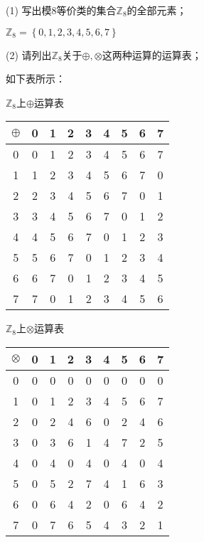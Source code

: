 (1) 写出模$8$等价类的集合$\mathbb{Z}_8$的全部元素；

\begin{Solution}
    $\mathbb{Z}_8 = \left\{0,1,2,3,4,5,6,7\right\}$
\end{Solution}

(2) 请列出$\mathbb{Z}_8$关于$\oplus,\otimes$这两种运算的运算表；

\begin{Solution}
    如下表所示：

\begin{minipage}[t]{0.45\linewidth}
        \centering
        \makeatletter{}\makeatother\caption{$\mathbb{Z}_8$上$\oplus$运算表}
        \begin{tabular}{|c|c|c|c|c|c|c|c|c|}
        \hline
        $\oplus$  & 0 &  1  & 2  & 3  & 4  & 5  & 6  & 7\\ \hline
        0  & 0 &  1  & 2  & 3  & 4  & 5  & 6  & 7\\ \hline
        1  & 1 &  2  & 3  & 4  & 5  & 6  & 7  & 0\\ \hline
        2  & 2 &  3  & 4  & 5  & 6  & 7  & 0  & 1\\ \hline
        3  & 3 &  4  & 5  & 6  & 7  & 0  & 1  & 2\\ \hline
        4  & 4 &  5  & 6  & 7  & 0  & 1  & 2  & 3\\ \hline
        5  & 5 &  6  & 7  & 0  & 1  & 2  & 3  & 4\\ \hline
        6  & 6 &  7  & 0  & 1  & 2  & 3  & 4  & 5\\ \hline
        7  & 7 &  0  & 1  & 2  & 3  & 4  & 5  & 6\\ \hline
        \end{tabular}
\end{minipage}%
\begin{minipage}[t]{0.45\linewidth}
        \centering
        \makeatletter{}\makeatother\caption{$\mathbb{Z}_8$上$\otimes$运算表}
        \begin{tabular}{|c|c|c|c|c|c|c|c|c|}
        \hline
        $\otimes$  & 0  & 1  & 2 &  3 &  4 &  5 &  6 &  7\\ \hline
        0  & 0  & 0  & 0 &  0 &  0 &  0 &  0 &  0\\ \hline
        1  & 0  & 1  & 2 &  3 &  4 &  5 &  6 &  7\\ \hline
        2  & 0  & 2  & 4 &  6 &  0 &  2 &  4 &  6\\ \hline
        3  & 0  & 3  & 6 &  1 &  4 &  7 &  2 &  5\\ \hline
        4  & 0  & 4  & 0 &  4 &  0 &  4 &  0 &  4\\ \hline
        5  & 0  & 5  & 2 &  7 &  4 &  1 &  6 &  3\\ \hline
        6  & 0  & 6  & 4 &  2 &  0 &  6 &  4 &  2\\ \hline
        7  & 0  & 7  & 6 &  5 &  4 &  3 &  2 &  1\\ \hline
        \end{tabular}
\end{minipage}
\\
\end{Solution}

